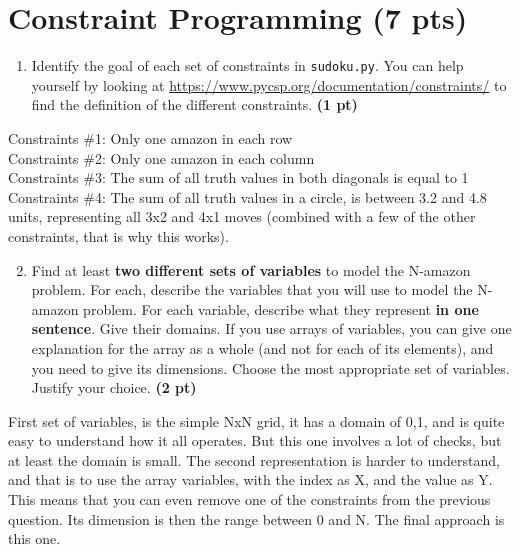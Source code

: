 \documentclass[11pt,a4paper]{report}
\begin{document}
\maketitle

\section{Constraint Programming (7 pts)}

\begin{enumerate}
\item Identify the goal of each set of constraints in \texttt{sudoku.py}. You can help yourself by looking 
at \url{https://www.pycsp.org/documentation/constraints/} to find the definition of the different constraints. \textbf{(1 pt)}
\end{enumerate}

\begin{answers}[4cm]
Constraints \#1:  Only one amazon in each row\\
Constraints \#2:  Only one amazon in each column\\
Constraints \#3:  The sum of all truth values in both diagonals is equal to 1\\
Constraints \#4:  The sum of all  truth values in a circle, is between 3.2 and 4.8 units, representing all 3x2 and 4x1 moves (combined with a few of the other constraints, that is why this works).
\end{answers}



\begin{enumerate}
	\setcounter{enumi}{1}
	\item Find at least \textbf{two different sets of variables} to model the N-amazon problem.
	For each, describe the variables that you will use to model the N-amazon problem. 
	For each variable, describe what they represent \textbf{in one sentence}. Give their domains.
	If you use arrays of variables, you can give one explanation for the array as a whole (and not for each of its elements), 
	and you need to give its dimensions.
	Choose the most appropriate set of variables. Justify your choice. \textbf{(2 pt)}

\end{enumerate}

\begin{answers}[6cm]

First set of variables, is the simple NxN grid, it has a domain of {0,1}, and is quite easy to understand how it all operates. But this one involves a lot of checks, but at least the domain is small.
The second representation is harder to understand, and that is to use the array variables, with the index as X, and the value as Y. This means that you can even remove one of the constraints from the previous question. Its dimension is then the range between 0 and N. The final approach is this one.

\end{answers}
\end{document}

